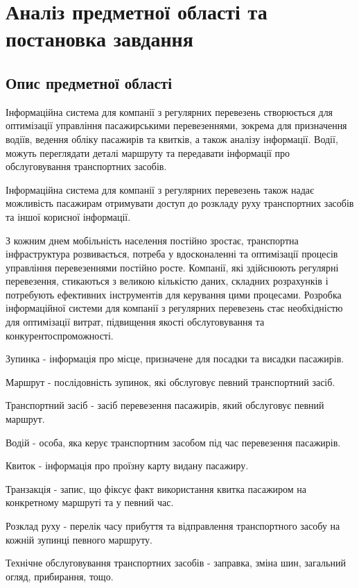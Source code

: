 \documentclass[oneside,14pt]{extarticle}
\begin{document}
\section{Аналіз предметної області та постановка завдання}
\subsection{Опис предметної області}
Інформаційна система для компанії з регулярних перевезень створюється для оптимізації управління пасажирськими перевезеннями, зокрема для призначення водіїв, ведення обліку пасажирів та квитків, а також аналізу інформації. Водії, можуть переглядати деталі маршруту та передавати інформації про обслуговування транспортних засобів.

Інформаційна система для компанії з регулярних перевезень також надає можливість пасажирам отримувати доступ до розкладу руху транспортних засобів та іншої корисної інформації.

З кожним днем мобільність населення постійно зростає, транспортна інфраструктура розвивається, потреба у вдосконаленні та оптимізації процесів управління перевезеннями постійно росте. Компанії, які здійснюють регулярні перевезення, стикаються з великою кількістю даних, складних розрахунків і потребують ефективних інструментів для керування цими процесами. Розробка інформаційної системи для компанії з регулярних перевезень стає необхідністю для оптимізації витрат, підвищення якості обслуговування та конкурентоспроможності.

\begin{list}{-}{Специфікація важливих понять:}
\item Зупинка - інформація про місце, призначене для посадки та висадки пасажирів.
\item Маршрут - послідовність зупинок, які обслуговує певний транспортний засіб.
\item Транспортний засіб - засіб перевезення пасажирів, який обслуговує певний маршрут.
\item Водій - особа, яка керує транспортним засобом під час перевезення пасажирів.
\item Квиток - інформація про проїзну карту видану пасажиру.
\item Транзакція - запис, що фіксує факт використання квитка пасажиром на конкретному маршруті та у певний час.
\item Розклад руху - перелік часу прибуття та відправлення транспортного засобу на кожній зупинці певного маршруту.
\item Технічне обслуговування транспортних засобів - заправка, зміна шин, загальний огляд, прибирання, тощо.
\end{list}
\end{document}
